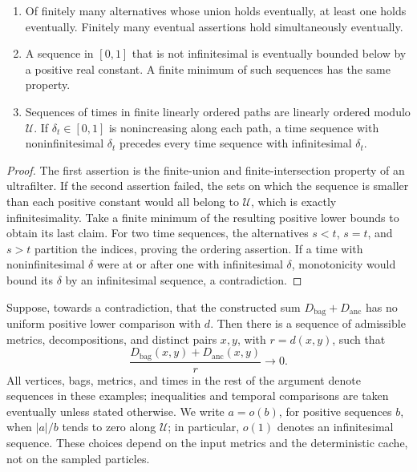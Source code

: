 \begin{lemma}\label{lem:finite-limiting-rules}
\leavevmode
\begin{enumerate}
\item Of finitely many alternatives whose union holds eventually, at
least one holds eventually.  Finitely many eventual assertions hold
simultaneously eventually.
\item A sequence in $[0,1]$ that is not infinitesimal is eventually
bounded below by a positive real constant.  A finite minimum of such
sequences has the same property.
\item Sequences of times in finite linearly ordered paths are linearly
ordered modulo $\mathcal U$.  If $\delta_t\in[0,1]$ is nonincreasing
along each path, a time sequence with noninfinitesimal $\delta_t$
precedes every time sequence with infinitesimal $\delta_t$.
\end{enumerate}
\end{lemma}

\begin{proof}
The first assertion is the finite-union and finite-intersection property
of an ultrafilter.  If the second assertion failed, the sets on which the
sequence is smaller than each positive constant would all belong to
$\mathcal U$, which is exactly infinitesimality.  Take a finite minimum
of the resulting positive lower bounds to obtain its last claim.
For two time sequences, the alternatives $s<t$, $s=t$, and $s>t$
partition the indices, proving the ordering assertion.  If a time with
noninfinitesimal $\delta$ were at or after one with infinitesimal $\delta$,
monotonicity would bound its $\delta$ by an infinitesimal sequence, a
contradiction.
\end{proof}

Suppose, towards a contradiction, that the constructed sum
$D_{\mathrm{bag}}+D_{\mathrm{anc}}$ has no uniform positive lower
comparison with $d$.  Then there is a sequence of admissible metrics,
decompositions, and distinct pairs $x,y$, with $r=d(x,y)$, such that
\begin{equation}\label{eq:failed-lower-comparison}
 \frac{D_{\mathrm{bag}}(x,y)+D_{\mathrm{anc}}(x,y)}{r}
 \longrightarrow 0.
\end{equation}
All vertices, bags, metrics, and times in the rest of the argument denote
sequences in these examples; inequalities and temporal comparisons are
taken eventually unless stated otherwise. We write $a=o(b)$, for
positive sequences $b$, when $|a|/b$ tends to zero along $\mathcal U$;
in particular, $o(1)$ denotes an infinitesimal sequence. These choices
depend on the input metrics and the deterministic cache, not on the
sampled particles.

